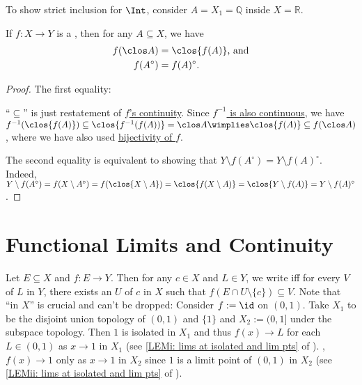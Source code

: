 	\begin{rmk}
		To show strict inclusion for $\Int$, consider $A = X_1 = \mathbb Q$ inside $X = \mathbb R$.
	\end{rmk}
	

	\begin{lem}\label{LEM: homeo img of clos and int}
		If $f\colon X\to Y$ is a \homeo, then for any $A\subseteq X$, we have
		\begin{align*}
			f(\clos A) & = \clos{f(A)}\text{, and}\\
			f(A^\circ) & = f(A)^\circ\text.
		\end{align*}
	\end{lem}
	
	\begin{proof}
		The first equality:
		\begin{subproof}
			``$\subseteq$'' is just restatement of \uline{$f$'s continuity}. Since \uline{$f^{-1}$ is also continuous}, we have $f^{-1}(\clos{f(A)})\subseteq \clos{f^{-1}(f(A))} = \clos A\wimplies \clos{f(A)}\subseteq f(\clos A)$, where we have also used \uline{bijectivity of $f$}.
		\end{subproof}
		
		The second equality is equivalent to showing that $Y\setminus f(A^\circ) = Y\setminus f(A)^\circ$. Indeed, $Y\setminus f(A^\circ) = f(X\setminus A^\circ) = f(\clos{X\setminus A}) = \clos{f(X\setminus A)} = \clos{Y\setminus f(A)} = Y\setminus f(A)^\circ$.
	\end{proof}
	



\section{Functional Limits and Continuity}

	Let $E\subseteq X$ and $f\colon E\to Y$. Then for any $c\in X$ and $L\in Y$, we write  iff for every \onbd $V$ of $L$ in $Y$, there exists an \onbd $U$ of $c$ in $X$ such that $f(E\cap U\setminus\{c\})\subseteq V$. Note that ``in $X$'' is crucial and can't be dropped: Consider $f := \id$ on $(0, 1)$. Take $X_1$ to be the disjoint union topology of $(0, 1)$ and $\{1\}$ and $X_2 := (0, 1]$ under the subspace topology. Then $1$ is isolated in $X_1$ and thus $f(x)\to L$ for each $L\in (0, 1)$ as $x\to 1$ in $X_1$ (see \ref{LEMi: lims at isolated and lim pts} of ). \Otoh, $f(x)\to 1$ only as $x\to 1$ in $X_2$ since $1$ is a limit point of $(0, 1)$ in $X_2$ (see \ref{LEMii: lims at isolated and lim pts} of ).
	
